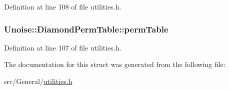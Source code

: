 Definition at line 108 of file utilities.\-h.

\hypertarget{struct_unoise_1_1_diamond_perm_table_abbdd2c631912b46dd642a1742fafc2cc}{
\subsubsection[{perm\-Table}]{ Unoise\-::\-Diamond\-Perm\-Table\-::perm\-Table}}\label{struct_unoise_1_1_diamond_perm_table_abbdd2c631912b46dd642a1742fafc2cc}


Definition at line 107 of file utilities.\-h.



The documentation for this struct was generated from the following file\-:\begin{DoxyCompactItemize}
\item 
src/\-General/\hyperlink{utilities_8h}{utilities.\-h}\end{DoxyCompactItemize}
